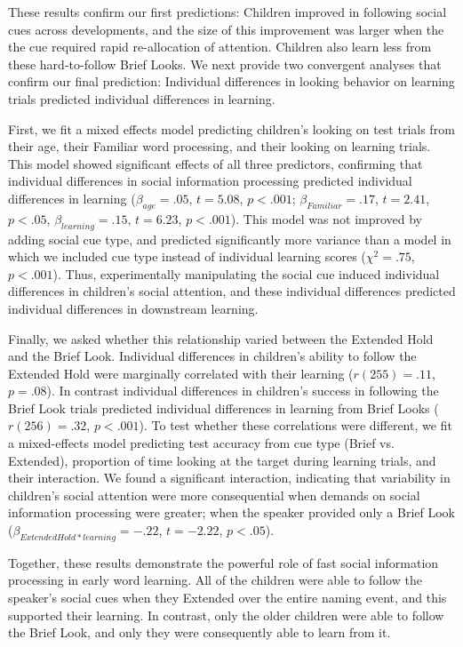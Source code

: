 \documentclass[jou,floatsintext]{apa6}
\begin{document}
These results confirm our first predictions: Children improved in following social cues across developments, and the size of this improvement was larger when the the cue required rapid re-allocation of attention. Children also learn less from these hard-to-follow Brief Looks. We next provide two convergent analyses that confirm our final prediction: Individual differences in looking behavior on learning trials predicted individual differences in learning.

First, we fit a mixed effects model predicting children's looking on test trials from their age, their Familiar word processing, and their looking on learning trials. This model showed significant effects of all three predictors, confirming that individual differences in social information processing predicted individual differences in learning ($\beta_{age} = .05$, $t = 5.08$, $p < .001$; $\beta_{Familiar} = .17$, $t = 2.41$, $p < .05$, $\beta_{learning} = .15$, $t = 6.23$, $p < .001$). This model was not improved by adding social cue type, and predicted significantly more variance than a model in which we included cue type instead of individual learning scores ($\chi^{2} = .75$, $p < .001$). Thus, experimentally manipulating the social cue induced individual differences in children's social attention, and these individual differences predicted individual differences in downstream learning.

Finally, we asked whether this relationship varied between the Extended Hold and the Brief Look. Individual differences in children's ability to follow the Extended Hold were marginally correlated with their learning ($r(255) = .11$, $p = .08$). In contrast individual differences in children's success in following the Brief Look trials predicted individual differences in learning from Brief Looks ($r(256) = .32$, $p <.001$). To test whether these correlations were different, we fit a mixed-effects model predicting test accuracy from cue type (Brief vs. Extended), proportion of time looking at the target during learning trials, and their interaction. We found a significant interaction, indicating that variability in children's social attention were more consequential when demands on social information processing were greater; when the speaker provided only a Brief Look ($\beta_{Extended Hold * learning} = -.22$, $t = -2.22$, $p < .05$).

Together, these results demonstrate the powerful role of fast social information processing in early word learning. All of the children were able to follow the speaker's social cues when they Extended over the entire naming event, and this supported their learning. In contrast, only the older children were able to follow the Brief Look, and only they were consequently able to learn from it.
\end{document}

